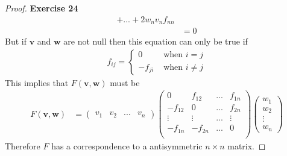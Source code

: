 \documentclass[11pt]{article}
\theoremstyle{definition}
\begin{document}
\begin{proof}{\textbf{Exercise 24}}
\begin{align*}
        + ... + 2w_nv_nf_{nn}\\
        &= 0
    \end{align*}
    But if $\bm{v}$ and $\bm{w}$ are not null then this equation can only be
    true if
    \begin{align*}
        f_{ij} = \begin{cases}
            0 &\text{ when } i = j\\
            -f_{ji} &\text{ when } i \neq j
        \end{cases}
    \end{align*}
    This implies that $F(\bm{v}, \bm{w})$ must be
    \begin{align*}
        F(\bm{v}, \bm{w})
        &= \begin{pmatrix} v_1 & v_2 & ... & v_n\end{pmatrix}
        \begin{pmatrix}
            0 & f_{12} & ... & f_{1n}\\
            -f_{12} & 0 & ... & f_{2n}\\
            \vdots & \vdots & ... & \vdots\\
            -f_{1n} & -f_{2n} & ... & 0\\
        \end{pmatrix}
        \begin{pmatrix} w_1 \\ w_2 \\ \vdots \\ w_n\end{pmatrix}
    \end{align*}
    Therefore $F$ has a correspondence to a antisymmetric $n\times n$ matrix.
\end{proof}
\cleardoublepage
\end{document}
